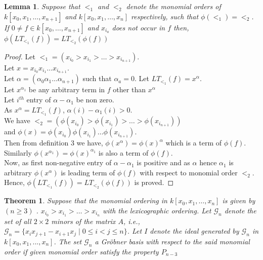 \documentclass[12pt,a4paper]{article}
\newtheorem{theorem}{Theorem}
\newtheorem{lemma}{Lemma}
\theoremstyle{definition}
\begin{document}
\begin{lemma}
Suppose that $<_1$ and $<_2$ denote the monomial orders of $k[x_0, x_1, \ldots, x_{n+1}]$ and $k[x_0, x_1, \ldots , x_n]$ respectively, such that $\phi(<_{1})=<_{2}$. If $0 \neq f \in k[x_0, \ldots , x_{n+1}]$ and $x_{i_a}$ does not occur in $f$ then,\\
$\phi(LT_{<_{1}}(f))=LT_{<_2}(\phi(f))$\\
\end{lemma}
\begin{proof}
Let $<_1=(x_{i_{0}}>x_{i_{1}}>\ldots >x_{i_{n+1}})$. \\
Let $x=x_{i_{0}}x_{i_{1}}\ldots x_{i_{n+1}}$.\\ 
Let $\alpha = (\alpha_{0}\alpha_{1}\ldots \alpha_{n+1})$ such that $\alpha_{a}=0$.
Let $LT_{<_{1}}(f)=x^{\alpha}$.\\
Let $x^{\alpha_{1}}$ be any arbitrary term in $f$ other than $x^\alpha$ \\
Let $i^{th}$ entry of $\alpha-\alpha_{1}$ be non zero.\\
As $x^{\alpha}=LT_{<_{1}}(f)$, $\alpha(i)-\alpha_{1}(i)>0$.\\
We have $<_2=(\phi(x_{i_{0}})>\phi(x_{i_{1}})>\ldots >\phi(x_{i_{n+1}}))$\\
and $\phi(x)=\phi(x_{i_{0}})\phi(x_{i_{1}})\ldots \phi(x_{i_{n+1}})$.\\
Then from definition 3 we have, $\phi(x^{\alpha})=\phi(x)^{\alpha}$ which is a term of $\phi(f)$. Similarly $\phi(x^{\alpha_{1}})=\phi(x)^{\alpha_{1}}$ is also a term of $\phi(f)$.\\
Now, as first non-negative entry of $\alpha-\alpha_{1}$ is positive and as $\alpha$ hence $\alpha_1$ is arbitrary $\phi(x^{\alpha})$ is leading term of $\phi(f)$ with respect to monomial order $<_2$.\\
Hence, $\phi(LT_{<_{1}}(f))=LT_{<_2}(\phi(f))$ is proved.
  
\end{proof}


\begin{theorem}
Suppose that the monomial ordering in $k[x_{0},x_{1}, \ldots , x_{n}]$ is given by $( n \geq 3)$ .
$x_{i_{0}} > x_{i_{1}} > \ldots > x_{i_{n}} $ with the lexicographic ordering. Let $\mathcal{G}_n$ denote the set of all $2\times 2$ minors of the matrix $A$, i.e., $\mathcal{G}_n = \{x_{i}x_{j+1}-x_{i+1}x_{j} \mid 0 \leq i < j \leq n\}$. Let $I$ denote the  ideal  generated by $\mathcal{G}_n$ in $k[x_{0}, x_{1},...,x_{n}]$. The set $\mathcal{G}_n$ a Gr\"{o}bner  basis with respect to the said monomial order if given monomial  order satisfy the property $P_{n-3}$
\end{theorem}
\end{document}
